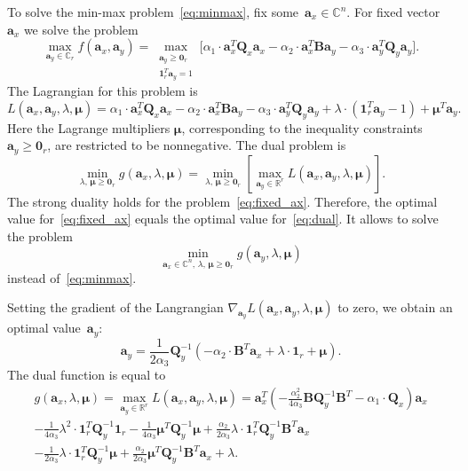 \documentclass[12pt,twoside]{article}
\newcommand{\ba}{\mathbf{a}}
\newcommand{\bB}{\mathbf{B}}
\newcommand{\bQ}{\mathbf{Q}}
\newcommand{\bbR}{\mathbb{R}}
\newcommand{\bmu}{\boldsymbol{\mu}}
\newcommand{\bOne}{\boldsymbol{1}}
\newcommand{\bZero}{\boldsymbol{0}}
\begin{document}
To solve the min-max problem~\eqref{eq:minmax}, fix some~$\ba_x \in \mathbb{C}^n$. For fixed vector~$\ba_x$ we solve the problem
\begin{equation}
	\max_{\ba_y \in \mathbb{C}_r} f(\ba_x, \ba_y) = \max_{\substack{\ba_y \geq \bZero_r \\ \bOne_r^T\ba_y=1}} \bigl[\alpha_1 \cdot \ba_x^T \bQ_x \ba_x - \alpha_2 \cdot \ba_x^T \bB \ba_y - \alpha_3 \cdot \ba_y^T \bQ_y \ba_y \bigr].
	\label{eq:fixed_ax}
\end{equation}
The Lagrangian for this problem is
\[
	L(\ba_x, \ba_y, \lambda, \bmu) = \alpha_1 \cdot \ba_x^T \bQ_x \ba_x - \alpha_2 \cdot \ba_x^T \bB \ba_y - \alpha_3 \cdot \ba_y^T \bQ_y \ba_y + \lambda \cdot  (\bOne_r^T \ba_y - 1) + \bmu^T \ba_y.
\]
Here the Lagrange multipliers $\bmu$, corresponding to the inequality constraints $\ba_y \geq \bZero_r$, are restricted to be nonnegative.
The dual problem is
\begin{equation}
	\min_{\lambda, \, \bmu \geq \bZero_r} g(\ba_x, \lambda, \bmu) = \min_{\lambda, \, \bmu \geq \bZero_r}  \left[\max_{\ba_y \in \bbR^r} L(\ba_x, \ba_y, \lambda, \bmu) \right].
	\label{eq:dual}
\end{equation}
The strong duality holds for the problem~\eqref{eq:fixed_ax}. Therefore, the optimal value for~\eqref{eq:fixed_ax} equals the optimal value for~\eqref{eq:dual}. It allows to solve the problem
\begin{equation}
	\min_{\ba_x \in \mathbb{C}^n, \, \lambda, \, \bmu \geq \bZero_r} g(\ba_y, \lambda, \bmu)
	\label{eq:dual_maxmin}
\end{equation}
instead of~\eqref{eq:minmax}.

Setting the gradient of the Langrangian $\nabla_{\ba_y} L(\ba_x, \ba_y, \lambda, \bmu)$ to zero, we obtain an optimal value~$\ba_y$:
\begin{equation}
	\ba_y = \frac{1}{2\alpha_3} \bQ_y^{-1} \left( - \alpha_2 \cdot \bB^T \ba_x +\lambda \cdot \bOne_r + \bmu \right).
	\label{eq:ax}
\end{equation}
The dual function is equal to
\begin{multline}
	g(\ba_x, \lambda, \bmu)
	= \max_{\ba_y \in \bbR^r} L(\ba_x, \ba_y, \lambda, \bmu) =
	\ba_x^T \left( - \frac{\alpha_2^2}{4\alpha_3} \bB \bQ_y^{-1} \bB^T - \alpha_1 \cdot \bQ_x\right) \ba_x \\ - \frac{1}{4 \alpha_3} \lambda^2 \cdot \bOne_r^T \bQ_y^{-1} \bOne_r - \frac{1}{4 \alpha_3} \bmu^T \bQ_y^{-1} \bmu + \frac{\alpha_2}{2 \alpha_3} \lambda \cdot \bOne_r^T \bQ_y^{-1} \bB^T \ba_x \\ - \frac{1}{2 \alpha_3} \lambda \cdot \bOne_r^T \bQ_y^{-1} \bmu + \frac{\alpha_2}{2 \alpha_3} \bmu^T \bQ_y^{-1} \bB^T \ba_x + \lambda.
	 \label{eq:dual_quadratic_form}
\end{multline}
\end{document}
